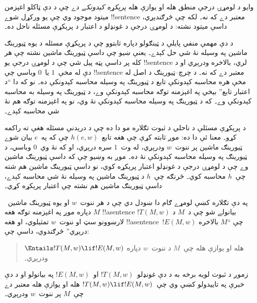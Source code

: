 \documentclass[../../../include/open-logic-section]{subfiles}
\begin{document}

وايو د لومړۍ درجې منطق هله او يوازې هله \emph{پرېکړه کېدونکے} دے
چې د دې ټاکلو اغېزمن ميتود موجود وي چې يو ورکړل شوے !!{sentence}
معتبر دے که نه۔ لکه چې څرګندېږي، داسې ميتود نشته: د لومړۍ درجې د
غونډلو د اعتبار د پرېکړې مسئله ناحل ده۔

د دې مهمې منفي پايلې د ټينګولو دپاره ثابتوو چې د پرېکړې مسئله د يوه
ټيورينګ ماشين په وسيله نۀ شي حل کېدے۔ يعنې ښيو چې داسې ټيورينګ ماشين
نشته چې هر کله پر داسې پټه پيل شي چې د لومړۍ درجې يو !!{sentence}
لري، بالاخره ودرېږي او د دې له مخې~$1$ يا~$0$ وباسي چې !!{sentence}
معتبر دے که نه۔ د چرچ--ټيورينګ د اصل له مخې هره محاسبه کېدونکې تابع
د ټيورينګ په وسيله محاسبه کېدونکې ده۔ نو که دا ``د اعتبار تابع''
بيخي په اغېزمنه توګه محاسبه کېدونکې وے، د ټيورينګ په وسيله به محاسبه
کېدونکې وے۔ که د ټيورينګ په وسيله محاسبه کېدونکې نۀ وي، نو په
اغېزمنه توګه هم نۀ شي محاسبه کېدے۔

د پرېکړې مسئلې د ناحلي د ثبوت تګلاره مو دا ده چې د درېدنې مسئله هغې
ته راکمه کړو۔ معنا ئې دا ده: موږ ثابته کړې چې هغه تابع~$h(e,w)$ چې
که په~$e$ بيان شوے ټيورينګ ماشين پر ننوت~$w$ ودرېږي، له وت~$1$ سره
درېږي، او که نۀ وي~$0$ وباسي، د ټيورينګ په وسيله محاسبه کېدونکې نۀ
ده۔ موږ به وښيو چې که داسې ټيورينګ ماشين وے چې د لومړۍ درجې د غونډلو
اعتبار پرېکړه کوي، نو داسې ټيورينګ ماشين هم شته چې~$h$ محاسبه کوي۔
څرنګه چې~$h$ د ټيورينګ ماشين په وسيله نۀ شي محاسبه کېدے، داسې
ټيورينګ ماشين هم نشته چې اعتبار پرېکړه کړي۔

په دې تګلاره کښې لومړے ګام دا ښودل دي چې د هر ننوت~$w$ او يوه
ټيورينګ ماشين~$M$ دپاره موږ په اغېزمنه توګه هغه !!a{sentence}
$!T(M, w)$ بيانولے شو چې د~$M$ د لارښوونو سټ او ننوت~$w$ تمثيلوي،
او هغه !!a{sentence}~$!E(M, w)$ چې ``$M$ بالاخره درېږي'' څرګندوي،
داسې چې:
\begin{quote}
  $\Entails !T(M, w) \lif !E(M,w)$ هله او يوازې هله چې~$M$ د
  ننوت~$w$ دپاره ودرېږي۔
\end{quote}
زموږ د ثبوت لويه برخه به د دې غونډلو~$!T(M, w)$ او~$!E(M, w)$ په
بيانولو او د دې خبرې په تاييدولو کښې وي چې~$!T(M, w) \lif !E(M, w)$
هله او يوازې هله معتبر دے چې~$M$ پر ننوت~$w$ ودرېږي۔
\end{document}
